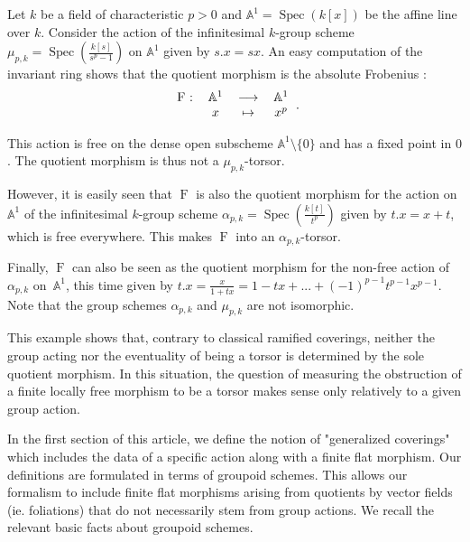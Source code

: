 \documentclass{amsart}
\theoremstyle{definition}
\theoremstyle{remark}
\newtheorem{subcounter}[subsection]{$\!\!$}
\newenvironment{exam*}{\begin{subcounter} \rm {\bf Example.}}\end{subcounter}
\begin{document}
\begin{exam*}
\label{ex}
Let $k$ be a field of characteristic $p>0$ and ${\mathbb{A}}^1 = \operatorname{Spec}(k[x])$ be the affine line over $k$. Consider the action of the infinitesimal $k$-group scheme $\mu_{p,k} = \operatorname{Spec}(\frac{k[s]}{s^p-1})$ on ${\mathbb{A}}^1$ given by $s.x= sx$. An easy computation of the invariant ring shows that the quotient morphism is the absolute Frobenius : \[ \begin{tabular}{cccc}
$\operatorname{F}$ : & ${\mathbb{A}}^1$ & ${\longrightarrow}$ & ${\mathbb{A}}^1$ \\ 

& $x$ & $\mapsto$ & $x^p$ \\ 

\end{tabular}. \] 

This action is free on the dense open subscheme ${\mathbb{A}}^1 \setminus \{0\} $ and has a fixed point in $0$. The quotient morphism is thus not a $\mu_{p,k}$-torsor.

However, it is easily seen that $\operatorname{F}$ is also the quotient morphism for the action on ${\mathbb{A}}^1$ of the infinitesimal $k$-group scheme $\alpha_{p,k} = \operatorname{Spec}(\frac{k[t]}{t^p})$ given by $t.x = x + t$, which is free everywhere. This makes $\operatorname{F}$ into an $\alpha_{p,k}$-torsor.

Finally, $\operatorname{F}$ can also be seen as the quotient morphism for the non-free action of $\alpha_{p,k}$ on~${\mathbb{A}}^1$, this time given by $t.x = \frac{x}{1+tx} = 1 -tx +...+ (-1)^{p-1}t^{p-1}x^{p-1}$. Note that the group schemes $\alpha_{p,k}$ and $\mu_{p,k}$ are not isomorphic.

\end{exam*}
This example shows that, contrary to classical ramified coverings, neither the group acting nor the eventuality of being a torsor is determined by the sole quotient morphism. In this situation, the question of measuring the obstruction of a finite locally free morphism to be a torsor makes sense only relatively to a given group action.  

\bigskip
{}

\medskip

In the first section of this article, we define the notion of "generalized coverings" which includes the data of a specific action along with a finite flat morphism. Our definitions are formulated in terms of groupoid schemes. This allows our formalism to include finite flat morphisms arising from quotients by vector fields (ie. foliations) that do not necessarily stem from group actions. We recall the relevant basic facts about groupoid schemes.
 
\end{document}
